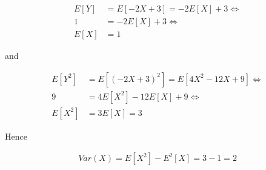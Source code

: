 \begin{align*}
  E[Y] &= E[-2X + 3] = -2E[X] + 3 \Leftrightarrow \\
     1 &= -2E[X] + 3 \Leftrightarrow \\
  E[X] &= 1
\end{align*}

and

\begin{align*}
  E[Y^2] &= E[(-2X + 3)^2] = E[4X^2 - 12X + 9] \Leftrightarrow \\
       9 &= 4E[X^2] - 12E[X] + 9 \Leftrightarrow \\
  E[X^2] &= 3E[X] = 3
\end{align*}

Hence

\begin{align*}
  Var(X) = E[X^2] - E^2[X] = 3 - 1 = 2
\end{align*}
